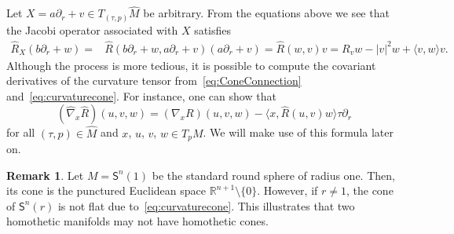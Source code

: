 \documentclass[11pt,a4paper,final]{amsart}
\newcommand{\s}{\mathsf}
\newcommand{\R}{\mathbb{R}}
\renewcommand{\hat}{\widehat}
\theoremstyle{definition}
\newtheorem{remark}[theorem]{Remark}
\begin{document}
Let $X=a\partial_{r}+v\in T_{(\tau,p)}\hat{M}$ be arbitrary.
From the equations above we see that the Jacobi operator associated with $X$ satisfies
\[
	\begin{aligned}
		\hat{R}_{X}(b \partial_{r}+w)={}&\hat{R}(b \partial_{r}+w,a\partial_{r}+v)(a\partial_{r}+v)=\hat{R}(w,v)v={}R_{v}w-\lvert v \rvert^{2}w+\langle v,w \rangle v.
	\end{aligned}
\]
Although the process is more tedious, it is possible to compute the covariant derivatives of the curvature tensor from~\eqref{eq:ConeConnection} and~\eqref{eq:curvaturecone}.
For instance, one can show that
\begin{equation}\label{eq:coneNablaR}
	(\hat{\nabla}_{x}\hat{R})(u,v,w)=(\nabla_{x}R)(u,v,w)-\langle x,\hat{R}(u,v)w \rangle \tau\partial_r
\end{equation}
for all $(\tau,p)\in \hat{M}$ and $x$, $u$, $v$, $w\in T_{p}M$.
We will make use of this formula later on.

\begin{remark}
	Let $M=\s{S}^{n}(1)$ be the standard round sphere of radius one. Then, its cone is the punctured Euclidean space $\R^{n+1}\setminus \{0\}$.
	However, if $r\neq 1$, the cone of $\s{S}^{n}(r)$ is not flat due to~\eqref{eq:curvaturecone}.
	This illustrates that two homothetic manifolds may not have homothetic cones.
\end{remark}
	
\end{document}

